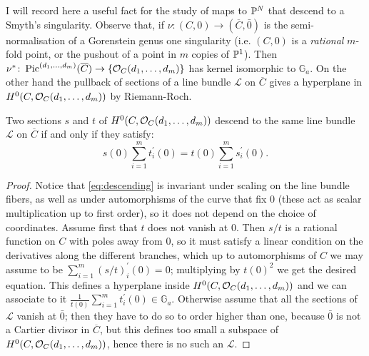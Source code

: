 I will record here a useful fact for the study of maps to $\mathbb P^N$ that descend to a Smyth's singularity. Observe that, if $\nu\colon (C,0)\to (\overline{C},\bar{0})$ is the semi-normalisation of a Gorenstein genus one singularity (i.e. $(C,0)$ is a \emph{rational} $m$-fold point, or the pushout of a point in $m$ copies of $\mathbb P^1$). Then $\nu^*\colon \operatorname{Pic}^{(d_1,\ldots,d_m)}(\overline{C})\rightarrow \{\mathcal{O}_{C}(d_1,\ldots,d_m)\}$ has kernel isomorphic to $\mathbb G_a$. On the other hand the pullback of sections of a line bundle $\mathcal L$ on $\overline{C}$ gives a hyperplane in $H^0(C,\mathcal{O}_{C}(d_1,\ldots,d_m))$ by Riemann-Roch.
\begin{lemma}\label{lem:fundamental}
 Two sections $s$ and $t$ of $H^0(C,\mathcal{O}_{C}(d_1,\ldots,d_m))$ descend to the same line bundle $\mathcal L$ on $\overline{C}$ if and only if they satisfy: \begin{equation}\label{eq:descending}s(0)\sum_{i=1}^m t_i^\prime(0)=t(0)\sum_{i=1}^m s_i^\prime(0).\end{equation}
\end{lemma}
\begin{proof}
 Notice that \eqref{eq:descending} is invariant under scaling on the line bundle fibers, as well as under automorphisms of the curve that fix $0$ (these act as scalar multiplication up to first order), so it does not depend on the choice of coordinates. Assume first that $t$ does not vanish at $0$. Then $s/t$ is a rational function on $C$ with poles away from $0$, so it must satisfy a linear condition on the derivatives along the different branches, which up to automorphisms of $C$ we may assume to be $\sum_{i=1}^m (s/t)_i^\prime(0)=0$; multiplying by $t(0)^2$ we get the desired equation. This defines a hyperplane inside $H^0(C,\mathcal{O}_{C}(d_1,\ldots,d_m))$ and we can associate to it $\frac{1}{t(0)}\sum_{i=1}^m t_i^\prime(0)\in \mathbb G_a$. Otherwise assume that all the sections of $\mathcal L$ vanish at $\bar{0}$; then they have to do so to order higher than one, because $\bar{0}$ is not a Cartier divisor in $\overline{C}$, but this defines too small a subspace of $H^0(C,\mathcal{O}_{C}(d_1,\ldots,d_m))$, hence there is no such an $\mathcal L$.
\end{proof}

